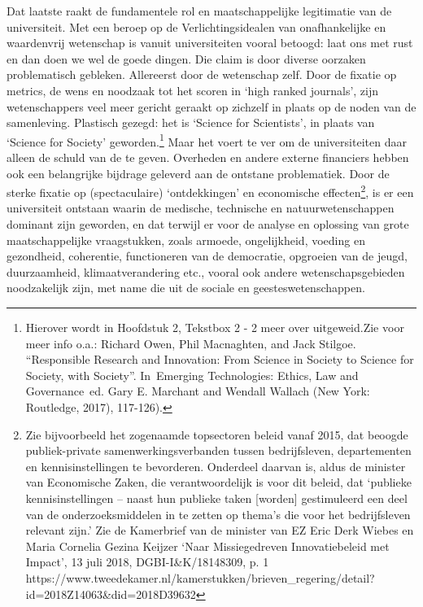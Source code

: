 \documentclass{jote-book}
\begin{document}
	Dat laatste raakt de fundamentele rol en maatschappelijke legitimatie van de universiteit. Met een beroep op de Verlichtingsidealen van onafhankelijke en waardenvrij wetenschap is vanuit universiteiten vooral betoogd: laat ons met rust en dan doen we wel de goede dingen. Die claim is door diverse oorzaken problematisch gebleken. Allereerst door de wetenschap zelf. Door de fixatie op metrics, de wens en noodzaak tot het scoren in ‘high ranked journals', zijn wetenschappers veel meer gericht geraakt op zichzelf in plaats op de noden van de samenleving. Plastisch gezegd: het is ‘Science for Scientists', in plaats van ‘Science for Society' geworden.\footnote{Hierover wordt in Hoofdstuk 2, Tekstbox 2 - 2 meer over uitgeweid.Zie voor meer info o.a.: Richard Owen, Phil Macnaghten, and Jack Stilgoe. “Responsible Research and Innovation: From Science in Society to Science for Society, with Society”. In Emerging Technologies: Ethics, Law and Governance ed. Gary E. Marchant and Wendall Wallach (New York: Routledge, 2017), 117-126). } Maar het voert te ver om de universiteiten daar alleen de schuld van de te geven. Overheden en andere externe financiers hebben ook een belangrijke bijdrage geleverd aan de ontstane problematiek. Door de sterke fixatie op (spectaculaire) ‘ontdekkingen' en economische effecten\footnote{Zie bijvoorbeeld het zogenaamde topsectoren beleid vanaf 2015, dat beoogde publiek-private samenwerkingsverbanden tussen bedrijfsleven, departementen en kennisinstellingen te bevorderen. Onderdeel daarvan is, aldus de minister van Economische Zaken, die verantwoordelijk is voor dit beleid, dat ‘publieke kennisinstellingen -- naast hun publieke taken [worden] gestimuleerd een deel van de onderzoeksmiddelen in te zetten op thema's die voor het bedrijfsleven relevant zijn.' Zie de Kamerbrief van de minister van EZ Eric Derk Wiebes en Maria Cornelia Gezina Keijzer ‘Naar Missiegedreven Innovatiebeleid met Impact', 13 juli 2018, DGBI-I\&K/18148309, p. 1 https://www.tweedekamer.nl/kamerstukken/brieven\_regering/detail?id=2018Z14063\&did=2018D39632}, is er een universiteit ontstaan waarin de medische, technische en natuurwetenschappen dominant zijn geworden, en dat terwijl er voor de analyse en oplossing van grote maatschappelijke vraagstukken, zoals armoede, ongelijkheid, voeding en gezondheid, coherentie, functioneren van de democratie, opgroeien van de jeugd, duurzaamheid, klimaatverandering etc., vooral ook andere wetenschapsgebieden noodzakelijk zijn, met name die uit de sociale en geesteswetenschappen.
\end{document}
